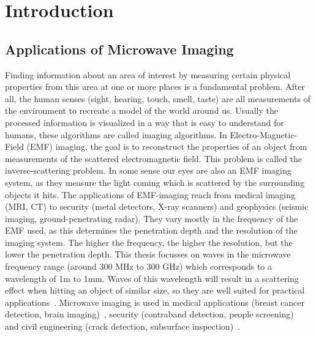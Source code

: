 
\chapter{Introduction}\label{chapter:introduction}

\section{Applications of Microwave Imaging}
Finding information about an area of interest by measuring certain physical properties from this area at one or more places is a fundamental problem.
After all, the human senses (sight, hearing, touch, smell, taste) are all measurements of the environment to recreate a model of the world around us.
Usually the processed information is visualized in a way that is easy to understand for humans, these algorithms are called imaging algorithms.
In Electro-Magnetic-Field (EMF) imaging, the goal is to reconstruct the properties of an object from measurements of the scattered electromagnetic field.
This problem is called the inverse-scattering problem.
In some sense our eyes are also an EMF imaging system, as they measure the light coming  which is scattered by the surrounding objects it hits.
The applications of EMF-imaging reach from medical imaging (MRI, CT) to security (metal detectors, X-ray scanners) and geophysics (seismic imaging, ground-penetrating radar).
They vary mostly in the frequency of the EMF used, as this determines the penetration depth and the resolution of the imaging system.
The higher the frequency, the higher the resolution, but the lower the penetration depth.
This thesis focusses on waves in the microwave frequency range (around 300 MHz to 300 GHz) which corresponds to a wavelength of 1m to 1mm.
Waves of this wavelength will result in a scattering effect when hitting an object of similar size, so they are well suited for practical applications~\parencite{pastorino_microwave_2018}.
Microwave imaging is used in medical applications (breast cancer detection, brain imaging)~\parencite{wang_medical_2014}, security (contraband detection, people screening)~\parencite{ahmed_microwave_2021} and civil engineering (crack detection, subsurface inspection)~\parencite{pastorino_microwave_2018}.

